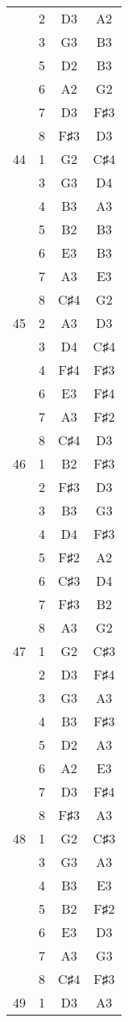 \documentclass{article}
\begin{document}
\begin{longtable}{|c|c|c|c|}
  & 2 & D3 & A2 \\ 
  & 3 & G3 & B3 \\ 
  & 5 & D2 & B3 \\ 
  & 6 & A2 & G2 \\ 
  & 7 & D3 & F♯3 \\ 
  & 8 & F♯3 & D3 \\ 
\hline
44 & 1 & G2 & C♯4 \\ 
  & 3 & G3 & D4 \\ 
  & 4 & B3 & A3 \\ 
  & 5 & B2 & B3 \\ 
  & 6 & E3 & B3 \\ 
  & 7 & A3 & E3 \\ 
  & 8 & C♯4 & G2 \\ 
\hline
45 & 2 & A3 & D3 \\ 
  & 3 & D4 & C♯4 \\ 
  & 4 & F♯4 & F♯3 \\ 
  & 6 & E3 & F♯4 \\ 
  & 7 & A3 & F♯2 \\ 
  & 8 & C♯4 & D3 \\ 
\hline
46 & 1 & B2 & F♯3 \\ 
  & 2 & F♯3 & D3 \\ 
  & 3 & B3 & G3 \\ 
  & 4 & D4 & F♯3 \\ 
  & 5 & F♯2 & A2 \\ 
  & 6 & C♯3 & D4 \\ 
  & 7 & F♯3 & B2 \\ 
  & 8 & A3 & G2 \\ 
\hline
47 & 1 & G2 & C♯3 \\ 
  & 2 & D3 & F♯4 \\ 
  & 3 & G3 & A3 \\ 
  & 4 & B3 & F♯3 \\ 
  & 5 & D2 & A3 \\ 
  & 6 & A2 & E3 \\ 
  & 7 & D3 & F♯4 \\ 
  & 8 & F♯3 & A3 \\ 
\hline
48 & 1 & G2 & C♯3 \\ 
  & 3 & G3 & A3 \\ 
  & 4 & B3 & E3 \\ 
  & 5 & B2 & F♯2 \\ 
  & 6 & E3 & D3 \\ 
  & 7 & A3 & G3 \\ 
  & 8 & C♯4 & F♯3 \\ 
\hline
49 & 1 & D3 & A3 \\ 

\end{longtable}
\end{document}
